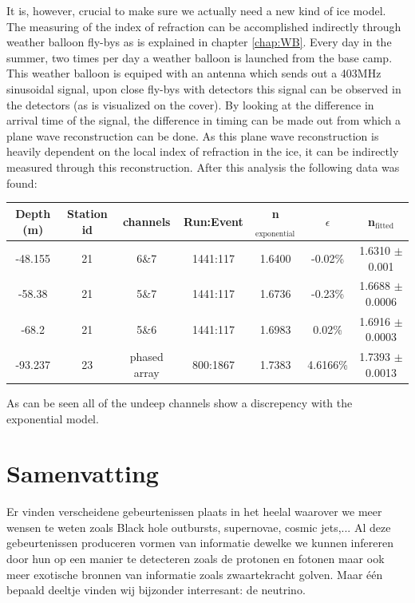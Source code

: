 \documentclass[11pt,a4paper,faculty=we,language=en,doctype=report]{cls/ugent-doc}
\begin{document}
It is, however, crucial to make sure we actually need a new kind of ice model. The measuring of the index of refraction
can be accomplished indirectly through weather balloon fly-bys as is explained in chapter \ref{chap:WB}. Every day
in the summer, two times per day a weather balloon is launched from the base camp. This weather balloon is equiped with
an antenna which sends out a 403MHz sinusoidal signal, upon close fly-bys with detectors this signal can be observed in the
detectors (as is visualized on the cover). By looking at the difference in arrival time of the signal, the difference in timing can be made out from 
which a plane wave reconstruction can be done. As this plane wave reconstruction is heavily dependent
on the local index of refraction in the ice, it can be indirectly measured through this reconstruction.
After this analysis the following data was found:
\begin{center}
\begin{tabular}{||c c c c c c c||}
 \hline
 Depth (m) & Station id & channels & Run:Event & n$_\text{exponential}$ & $\epsilon$ & n$_\text{fitted}$\\ [0.5ex]
 \hline\hline
-48.155 & 21 & 6\&7 & 1441:117 & 1.6400 & -0.02\% & 1.6310 $\pm$ 0.001 \\
 -58.38 & 21 & 5\&7 & 1441:117 & 1.6736 & -0.23\% & 1.6688 $\pm$ 0.0006 \\
 -68.2 & 21 & 5\&6 & 1441:117 & 1.6983 & 0.02\% & 1.6916 $\pm$ 0.0003 \\
 -93.237 & 23 & phased array & 800:1867 & 1.7383 & 4.6166\% & 1.7393 $\pm$ 0.0013 \\
 \hline
\end{tabular}
\end{center}

As can be seen all of the undeep channels show a discrepency with
the exponential model. 

\newpage
\chapter*{Samenvatting}
Er vinden verscheidene gebeurtenissen plaats in het heelal waarover we
meer wensen te weten zoals Black hole outbursts, supernovae, cosmic jets,...
Al deze gebeurtenissen produceren vormen van informatie dewelke we kunnen
infereren door hun op een manier te detecteren zoals de protonen en fotonen
maar ook meer exotische bronnen van informatie zoals zwaartekracht golven.
Maar één bepaald deeltje vinden wij bijzonder interresant: de neutrino.
\end{document}
